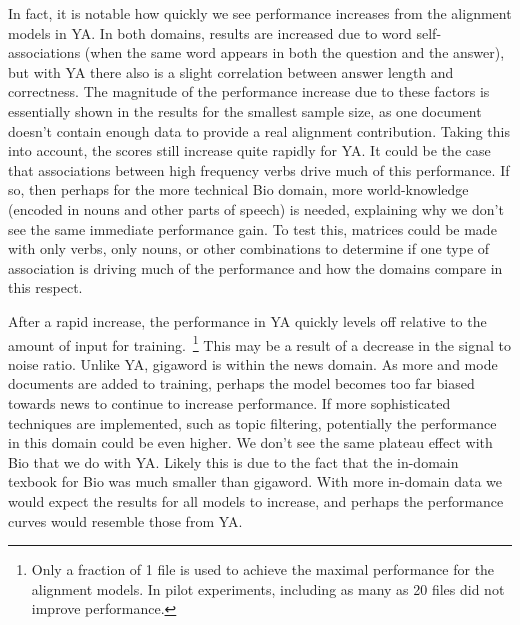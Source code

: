 In fact, it is notable how quickly we see performance increases from the alignment models in YA.  In both domains, results are increased due to word self-associations (when the same word appears in both the question and the answer), but with YA there also is a slight correlation between answer length and correctness.  The magnitude of the performance increase due to these factors is essentially shown in the results for the smallest sample size, as one document doesn't contain enough data to provide a real alignment contribution.  Taking this into account, the scores still increase quite rapidly for YA.  It could be the case that associations between high frequency verbs drive much of this performance.  If so, then perhaps for the more technical Bio domain, more world-knowledge (encoded in nouns and other parts of speech) is needed,  explaining why we don't see the same immediate performance gain.  To test this, matrices could be made with only verbs, only nouns, or other combinations to determine if one type of association is driving much of the performance and how the domains compare in this respect. 

After a rapid increase, the performance in YA quickly levels off relative to the amount of input for training.~\footnote{Only a fraction of 1 file is used to achieve the maximal performance for the alignment models.  In pilot experiments, including as many as 20 files did not improve performance. }  This may be a result of a decrease in the signal to noise ratio.  Unlike YA, gigaword is within the news domain.  As more and mode documents are added to training, perhaps the model becomes too far biased towards news to continue to increase performance.  If more sophisticated techniques are implemented, such as topic filtering, potentially the performance in this domain could be even higher.  We don't see the same plateau effect with Bio that we do with YA.  Likely this is due to the fact that the in-domain texbook for Bio was much smaller than gigaword.  With more in-domain data we would expect the results for all models to increase, and perhaps the performance curves would resemble those from YA.






